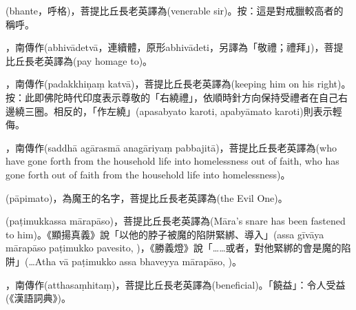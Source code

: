 \startitemgroup[noteitems]
\item{}(bhante，呼格)，菩提比丘長老英譯為(venerable sir)。按：這是對戒臘較高者的稱呼。
\stopitemgroup

\startitemgroup[noteitems]
\item{}，南傳作(abhivādetvā，連續體，原形abhivādeti，另譯為「敬禮；禮拜」)，菩提比丘長老英譯為(pay homage to)。
\stopitemgroup

\startitemgroup[noteitems]
\item{}，南傳作(padakkhiṇaṃ katvā)，菩提比丘長老英譯為(keeping him on his right)。按：此即佛陀時代印度表示尊敬的「右繞禮」，依順時針方向保持受禮者在自己右邊繞三圈。相反的，「作左繞」(apasabyato karoti, apabyāmato karoti)則表示輕侮。
\stopitemgroup

\startitemgroup[noteitems]
\item{}，南傳作(saddhā agārasmā anagāriyaṃ pabbajitā)，菩提比丘長老英譯為(who have gone forth from the household life into homelessness out of faith, who has gone forth out of faith from the household life into homelessness)。
\stopitemgroup

\startitemgroup[noteitems]
\item{}(pāpimato)，為魔王的名字，菩提比丘長老英譯為(the Evil One)。
\item{}(paṭimukkassa mārapāso)，菩提比丘長老英譯為(Māra's snare has been fastened to him)。《顯揚真義》說「以他的脖子被魔的陷阱緊綁、導入」(assa gīvāya mārapāso paṭimukko pavesito, )，《勝義燈》說「……或者，對他緊綁的會是魔的陷阱」(…Atha vā paṭimukko assa bhaveyya mārapāso, )。
\stopitemgroup

\startitemgroup[noteitems]
\item{}，南傳作(atthasaṃhitaṃ)，菩提比丘長老英譯為(beneficial)。「饒益」：令人受益(《漢語詞典》)。
\stopitemgroup

